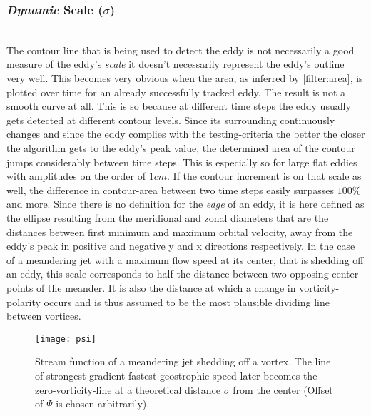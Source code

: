 \subsubsection{\textit{Dynamic} Scale ($\sigma$)} \label{filter:dynscale}
\\
The contour line that is being used to detect the eddy is not
necessarily a good measure of the eddy's \textit{scale} \ie it doesn't
necessarily represent the eddy's outline very well. This becomes very
obvious when the area, as inferred by \ref{filter:area}, is plotted over time
for an already successfully tracked eddy. The result is not a smooth curve at
all. This is so because at different time steps the eddy usually gets detected
at different contour levels. Since its surrounding continuously changes and
since the eddy complies with the testing-criteria the better the closer the
algorithm gets to the eddy's peak value, the determined area of the contour
jumps considerably between time steps. This is especially so for large flat
eddies with amplitudes on the order of $1cm$. If the contour increment is on
that scale as well, the difference in contour-area between two time steps
easily surpasses $100\%$ and more.
Since there is no definition for the \textit{edge} of an eddy, it is here
defined as the ellipse resulting from the meridional and zonal diameters that
are the distances between first minimum and maximum orbital velocity, away from
the eddy's peak in positive and negative y and x directions respectively.
In the case of a meandering jet with a maximum flow speed at its center, that
is shedding off an eddy, this scale corresponds to half the distance between
two opposing center-points of the meander. It is also the distance at which a
change in vorticity-polarity occurs and is thus assumed to be the most plausible
dividing line between vortices. \\
\begin{wrapfigure}{r}{0.3\textwidth}
	\texttt{[image: psi]}
	\caption{Stream function of a meandering jet shedding off a vortex. The line of strongest gradient \ie fastest geostrophic speed later becomes the zero-vorticity-line at a theoretical distance $\sigma$ from the center (Offset of $\Psi$ is chosen arbitrarily).}
	\label{fig:psi}
\end{wrapfigure}
